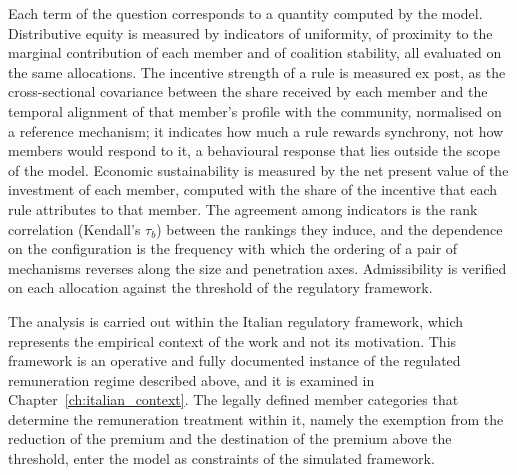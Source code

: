 Each term of the question corresponds to a quantity computed by the model. Distributive equity is measured by indicators of uniformity, of proximity to the marginal contribution of each member and of coalition stability, all evaluated on the same allocations. The incentive strength of a rule is measured ex post, as the cross-sectional covariance between the share received by each member and the temporal alignment of that member's profile with the community, normalised on a reference mechanism; it indicates how much a rule rewards synchrony, not how members would respond to it, a behavioural response that lies outside the scope of the model. Economic sustainability is measured by the net present value of the investment of each member, computed with the share of the incentive that each rule attributes to that member. The agreement among indicators is the rank correlation (Kendall's $\tau_b$) between the rankings they induce, and the dependence on the configuration is the frequency with which the ordering of a pair of mechanisms reverses along the size and penetration axes. Admissibility is verified on each allocation against the threshold of the regulatory framework.

The analysis is carried out within the Italian regulatory framework, which represents the empirical context of the work and not its motivation. This framework is an operative and fully documented instance of the regulated remuneration regime described above, and it is examined in Chapter~\ref{ch:italian_context}. The legally defined member categories that determine the remuneration treatment within it, namely the exemption from the reduction of the premium and the destination of the premium above the threshold, enter the model as constraints of the simulated framework.

